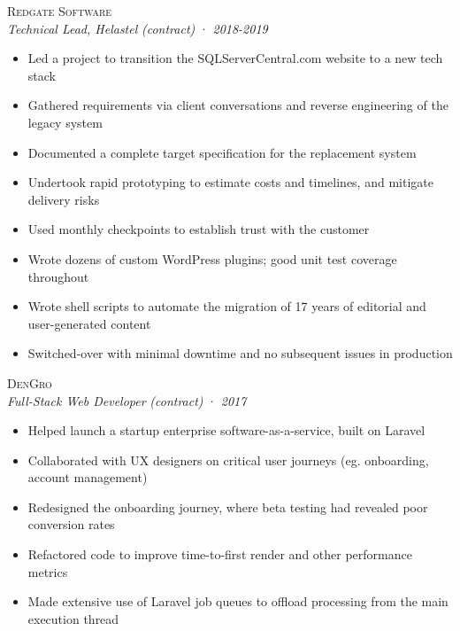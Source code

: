 \documentclass[a4paper,10pt]{article}
\newcommand{\resumeSubheading}[5][12pt]{
  \vspace{#1}
  {\scshape{#2}} \\
  \textit{\small{#3}} \textit{\small{(#4)}} · \textit{\small{#5}}
  \vspace{2pt}
}
\newcommand{\resumeListStart}{\begin{itemize}}
\newcommand{\resumeListEnd}{\end{itemize}}
\newcommand{\resumeItem}[1]{
  \item[\-·]\small{{#1\vspace{1pt}}}
}
\begin{document}
  \begin{minipage}{\textwidth}
    \resumeSubheading
      {Redgate Software}
      {Technical Lead, Helastel}
      {contract}
      {2018-2019}
    \resumeListStart
      \resumeItem{Led a project to transition the SQLServerCentral.com website to a new tech stack}
      \resumeItem{Gathered requirements via client conversations and reverse engineering of the legacy system}
      \resumeItem{Documented a complete target specification for the replacement system}
      \resumeItem{Undertook rapid prototyping to estimate costs and timelines, and mitigate delivery risks}
      \resumeItem{Used monthly checkpoints to establish trust with the customer}
      \resumeItem{Wrote dozens of custom WordPress plugins; good unit test coverage throughout}
      \resumeItem{Wrote shell scripts to automate the migration of 17 years of editorial and user-generated content}
      \resumeItem{Switched-over with minimal downtime and no subsequent issues in production}
    \resumeListEnd
  \end{minipage}


  \begin{minipage}{\textwidth}
    \resumeSubheading
      {DenGro}
      {Full-Stack Web Developer}
      {contract}
      {2017}
    \resumeListStart
      \resumeItem{Helped launch a startup enterprise software-as-a-service, built on Laravel}
      \resumeItem{Collaborated with UX designers on critical user journeys (eg. onboarding, account management)}
      \resumeItem{Redesigned the onboarding journey, where beta testing had revealed poor conversion rates}
      \resumeItem{Refactored code to improve time-to-first render and other performance metrics}
      \resumeItem{Made extensive use of Laravel job queues to offload processing from the main execution thread}
    \resumeListEnd
  \end{minipage}

\end{document}
